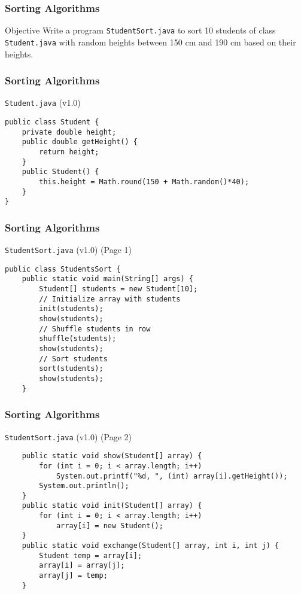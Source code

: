 \documentclass[10pt, compress]{beamer}
\begin{document}
\begin{frame}[fragile]
	\frametitle{Sorting Algorithms}
	\begin{block}{Objective}
		Write a program \texttt{StudentSort.java} to sort 10 students of class \texttt{Student.java} with random heights between 150 cm and 190 cm based on their heights.
	\end{block}
\end{frame}

\begin{frame}[fragile]
	\frametitle{Sorting Algorithms}
	\begin{block}{\texttt{Student.java} (v1.0)}
		\begin{verbatim}
public class Student {
	private double height;
	public double getHeight() {
		return height;
	}
	public Student() {
		this.height = Math.round(150 + Math.random()*40);
	}
}
		\end{verbatim}
	\end{block}
\end{frame}

\begin{frame}[fragile]
	\frametitle{Sorting Algorithms}
	\begin{block}{\texttt{StudentSort.java} (v1.0) (Page 1)}
		\begin{verbatim}
public class StudentsSort {
	public static void main(String[] args) {
		Student[] students = new Student[10];
		// Initialize array with students
		init(students);
		show(students);
		// Shuffle students in row
		shuffle(students);
		show(students);
		// Sort students
		sort(students);
		show(students);
	}
		\end{verbatim}
	\end{block}
\end{frame}

\begin{frame}[fragile]
	\frametitle{Sorting Algorithms}
	\begin{block}{\texttt{StudentSort.java} (v1.0) (Page 2)}
		\begin{verbatim}
	public static void show(Student[] array) {
		for (int i = 0; i < array.length; i++)
			System.out.printf("%d, ", (int) array[i].getHeight());
		System.out.println();
	}
	public static void init(Student[] array) {
		for (int i = 0; i < array.length; i++)
			array[i] = new Student();
	}
	public static void exchange(Student[] array, int i, int j) {
		Student temp = array[i];
		array[i] = array[j];
		array[j] = temp;
	}
		\end{verbatim}
	\end{block}
\end{frame}
\end{document}
